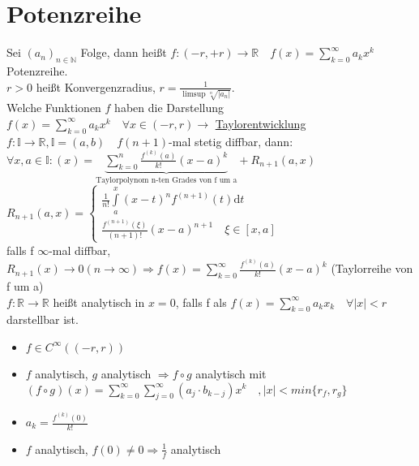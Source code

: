 \documentclass[10pt,a4paper^, twocolumn]{article}
\newcommand{\menge}{\mathbb} %
\renewcommand{\d}{\mathrm{d}} %
\begin{document}
\section{Potenzreihe}
	Sei $(a_n)_{n\in \menge{N}}$ Folge, 
	dann heißt $f:(-r,+r) \rightarrow \menge{R} \quad f(x) = \sum\limits_{k=0}^\infty a_kx^k$ Potenzreihe. \\
	$r > 0$ heißt Konvergenzradius, $r = \frac{1}{\limsup \sqrt[n]{|a_n|}}$. \\
	Welche Funktionen $f$ haben die Darstellung $f(x) = \sum\limits_{k=0}^\infty a_kx^k \quad \forall x \in (-r,r) \rightarrow$ \underline{Taylorentwicklung} \\
	$f: \menge{I} \rightarrow \menge{R}, \menge{I} = (a,b) \quad f (n+1)$-mal stetig diffbar, dann: \\
	$\forall x,a \in \menge{I}: (x) = \underbrace{ \sum\limits_{k=0}^{n} \frac{f^{(k)} (a)}{k!}(x-a)^k }_{\text{Taylorpolynom n-ten Grades von f um a}} + R_{n+1}(a,x)$ \\
	$R_{n+1}(a,x) = \begin{cases}
		\frac{1}{n!} \int\limits_a^x(x-t)^nf^{(n+1)}(t) \d t \\
		\frac{f^{(n+1)}(\xi)}{(n+1)!} (x-a)^{n+1} \quad \xi \in [x,a]
	\end{cases}$ \\
	falls f $\infty$-mal diffbar, $R_{n+1}(x) \rightarrow 0 (n \rightarrow \infty)
	\Rightarrow f(x) = \sum\limits_{k=0}^\infty \frac{f^{(k)}(a)}{k!} (x-a)^k$ \quad (Taylorreihe von f um a) \\
	$f:\menge{R} \rightarrow \menge{R}$ heißt analytisch in $x=0$, falls f als $f(x) = \sum\limits_{k=0}^\infty a_k x_k \quad \forall |x| < r$ darstellbar ist.
	\begin{itemize}
		\item $f \in C^\infty((-r,r))$
		\item $f$ analytisch, $g$ analytisch $\Rightarrow f \circ g$ analytisch mit
			$(f \circ g)(x) = \sum\limits_{k=0}^\infty \sum\limits_{j=0}^\infty (a_j \cdot b_{k-j})x^k \quad , |x| < min\{r_f, r_g\}$
		\item $a_k = \frac{f^{(k)}(0)}{k!}$
		\item $f$ analytisch, $f(0) \neq 0 \Rightarrow \frac{1}{f}$ analytisch
	\end{itemize}
\end{document}
